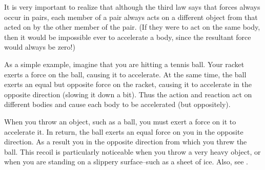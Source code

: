 {
It is very important to realize that although the third law says that forces
always occur in pairs, each member of a pair always acts on a different
object from that acted on by the other member of the pair.
(If they were to act on the same body, then it would be impossible ever to
accelerate a body, since the resultant force would always be zero!)

As a simple example, imagine that you are hitting a tennis ball.
Your racket exerts a force on the ball, causing it to accelerate.
At the same time, the ball exerts an equal but opposite force on the racket,
causing it to accelerate in the opposite direction (slowing it down a bit).
Thus the action and reaction act on different bodies and cause each body to
be accelerated (but oppositely).

When you throw an object, such as a ball, you must exert a force on it to
accelerate it.
In return, the ball exerts an equal force on you in the opposite direction.
As a result you  in the opposite direction from which you threw the
ball.
This recoil is particularly noticeable when you throw a very heavy object,
or when you are standing on a slippery surface--such as a sheet of ice.
Also, see .

}%
%
